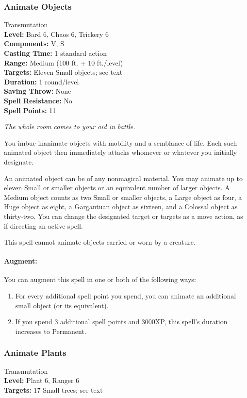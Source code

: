 \subsubsection{Animate Objects}
\label{Spell:AnimateObjects}
Transmutation
\\ \textbf{Level:} Bard 6, Chaos 6, Trickery 6
\\ \textbf{Components:} V, S
\\ \textbf{Casting Time:} 1 standard action
\\ \textbf{Range:} Medium (100 ft. + 10 ft./level)
\\ \textbf{Targets:} Eleven Small objects; see text
\\ \textbf{Duration:} 1 round/level
\\ \textbf{Saving Throw:} None
\\ \textbf{Spell Resistance:} No
\\ \textbf{Spell Points:} 11

\emph{The whole room comes to your aid in battle.}

You imbue inanimate objects with mobility and a semblance of life. 
Each such animated object then immediately attacks whomever or whatever you initially designate.

An animated object can be of any nonmagical material. 
You may animate up to eleven Small or smaller objects or an equivalent number of larger objects. 
A Medium object counts as two Small or smaller objects, a Large object as four, a Huge object as eight, 
a Gargantuan object as sixteen, and a Colossal object as thirty-two. 
You can change the designated target or targets as a move action, as if directing an active spell.

This spell cannot animate objects carried or worn by a creature.

\paragraph{Augment:} You can augment this spell in one or both of the following ways:
\begin{enumerate}
 \item For every additional spell point you spend, you can animate an additional small object (or its equivalent).
 \item If you spend 3 additional spell points and 3000XP, this spell's duration increases to Permanent.
\end{enumerate}
\subsubsection{Animate Plants}
\label{Spell:AnimatePlants}
Transmutation
\\ \textbf{Level:} Plant 6, Ranger 6
\\ \textbf{Targets:} 17 Small trees; see text


